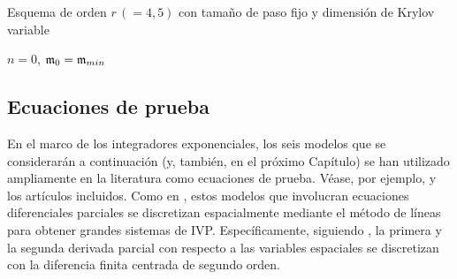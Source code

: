 {\SetAlgoNoLine
\begin{algorithm}[htb]
	\caption{Esquema de orden $r\,(=4,5)$ con tamaño de paso fijo y dimensión de Krylov variable}
	\label{alg:integratorfix}

	$n=0$, $\mathfrak{m}_0=\mathfrak{m}_{min}$ \\
\end{algorithm}
}

\subsection{Ecuaciones de prueba}\label{section:test-eq}
En el marco de los integradores exponenciales, los seis modelos que se considerarán a continuación (y, también, en el próximo Capítulo) se han utilizado ampliamente en la literatura como ecuaciones de prueba. Véase, por ejemplo, \cite{tokman2006efficient,tokman2012new,tokman2013comparative} y los artículos incluidos. Como en \cite{tokman2006efficient,tokman2012new,tokman2013comparative}, estos modelos que involucran ecuaciones diferenciales parciales se discretizan espacialmente mediante el método de líneas para obtener grandes sistemas de IVP. Específicamente, siguiendo \cite{tokman2006efficient,tokman2012new,tokman2013comparative}, la primera y la segunda derivada parcial con respecto a las variables espaciales se discretizan con la diferencia finita centrada de segundo orden.


